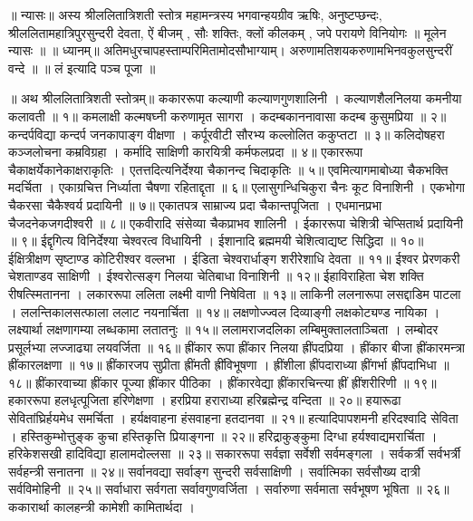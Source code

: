 ॥ न्यासः॥
अस्य श्रीललितात्रिशती स्तोत्र महामन्त्रस्य भगवान्हयग्रीव ऋषिः,
अनुष्टप्छन्दः, श्रीललितामहात्रिपुरसुन्दरी देवता,
ऐं बीजम् , सौः शक्तिः, क्लों कीलकम् , जपे परायणे विनियोगः ॥
मूलेन न्यासः ॥
॥ ध्यानम्॥
अतिमधुरचापहस्ताम्परिमितामोदसौभाग्याम्।
अरुणामतिशयकरुणामभिनवकुलसुन्दरीं वन्दे ॥
॥ लं इत्यादि पञ्च पूजा ॥

॥ अथ श्रीललितात्रिशती स्तोत्रम्॥
ककाररूपा कल्याणी कल्याणगुणशालिनी ।
कल्याणशैलनिलया कमनीया कलावती ॥ १॥
कमलाक्षी कल्मषघ्नी करुणामृत सागरा ।
कदम्बकाननावासा कदम्ब कुसुमप्रिया ॥ २॥
कन्दर्पविद्या कन्दर्प जनकापाङ्ग वीक्षणा ।
कर्पूरवीटी सौरभ्य कल्लोलित ककुप्तटा ॥ ३॥
कलिदोषहरा कञ्जलोचना कम्रविग्रहा ।
कर्मादि साक्षिणी कारयित्री कर्मफलप्रदा ॥ ४॥
एकाररूपा चैकाक्षर्येकानेकाक्षराकृतिः ।
एतत्तदित्यनिर्देश्या चैकानन्द चिदाकृतिः ॥ ५॥
एवमित्यागमाबोध्या चैकभक्ति मदर्चिता ।
एकाग्रचित्त निर्ध्याता चैषणा रहिताद्दृता ॥ ६॥
एलासुगन्धिचिकुरा चैनः कूट विनाशिनी ।
एकभोगा चैकरसा चैकैश्वर्य प्रदायिनी ॥ ७॥
एकातपत्र साम्राज्य प्रदा चैकान्तपूजिता ।
एधमानप्रभा चैजदनेकजगदीश्वरी ॥ ८॥
एकवीरादि संसेव्या चैकप्राभव शालिनी ।
ईकाररूपा चेशित्री चेप्सितार्थ प्रदायिनी ॥ ९॥
ईद्दृगित्य विनिर्देश्या चेश्वरत्व विधायिनी ।
ईशानादि ब्रह्ममयी चेशित्वाद्यष्ट सिद्धिदा ॥ १०॥
ईक्षित्रीक्षण सृष्टाण्ड कोटिरीश्वर वल्लभा ।
ईडिता चेश्वरार्धाङ्ग शरीरेशाधि देवता ॥ ११॥
ईश्वर प्रेरणकरी चेशताण्डव साक्षिणी ।
ईश्वरोत्सङ्ग निलया चेतिबाधा विनाशिनी ॥ १२॥
ईहाविराहिता चेश शक्ति रीषत्स्मितानना ।
लकाररूपा ललिता लक्ष्मी वाणी निषेविता ॥ १३॥
लाकिनी ललनारूपा लसद्दाडिम पाटला ।
ललन्तिकालसत्फाला ललाट नयनार्चिता ॥ १४॥
लक्षणोज्ज्वल दिव्याङ्गी लक्षकोट्यण्ड नायिका ।
लक्ष्यार्था लक्षणागम्या लब्धकामा लतातनुः ॥ १५॥
ललामराजदलिका लम्बिमुक्तालताञ्चिता ।
लम्बोदर प्रसूर्लभ्या लज्जाढ्या लयवर्जिता ॥ १६॥
ह्रींकार रूपा ह्रींकार निलया ह्रींपदप्रिया ।
ह्रींकार बीजा ह्रींकारमन्त्रा ह्रींकारलक्षणा ॥ १७॥
ह्रींकारजप सुप्रीता ह्रींमती ह्रींविभूषणा ।
ह्रींशीला ह्रींपदाराध्या ह्रींगर्भा ह्रींपदाभिधा ॥ १८॥
ह्रींकारवाच्या ह्रींकार पूज्या ह्रींकार पीठिका ।
ह्रींकारवेद्या ह्रींकारचिन्त्या ह्रीं ह्रींशरीरिणी ॥ १९॥
हकाररूपा हलधृत्पूजिता हरिणेक्षणा ।
हरप्रिया हराराध्या हरिब्रह्मेन्द्र वन्दिता ॥ २०॥
हयारूढा सेवितांघ्रिर्हयमेध समर्चिता ।
हर्यक्षवाहना हंसवाहना हतदानवा ॥ २१॥
हत्यादिपापशमनी हरिदश्वादि सेविता ।
हस्तिकुम्भोत्तुङ्क कुचा हस्तिकृत्ति प्रियाङ्गना ॥ २२॥
हरिद्राकुङ्कुमा दिग्धा हर्यश्वाद्यमरार्चिता ।
हरिकेशसखी हादिविद्या हालामदोल्लसा ॥ २३॥
सकाररूपा सर्वज्ञा सर्वेशी सर्वमङ्गला ।
सर्वकर्त्री सर्वभर्त्री सर्वहन्त्री सनातना ॥ २४॥
सर्वानवद्या सर्वाङ्ग सुन्दरी सर्वसाक्षिणी ।
सर्वात्मिका सर्वसौख्य दात्री सर्वविमोहिनी ॥ २५॥
सर्वाधारा सर्वगता सर्वावगुणवर्जिता ।
सर्वारुणा सर्वमाता सर्वभूषण भूषिता ॥ २६॥
ककारार्था कालहन्त्री कामेशी कामितार्थदा ।
